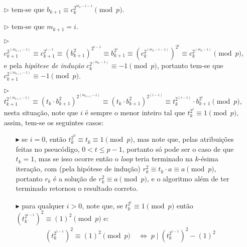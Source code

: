 \begin{enumerate}
\begin{itemize}
\begin{itemize}
                \vspace{4mm}
                \item[$\triangleright$] tem-se que $b_{k+1} \equiv c_{k}^{2^{m_k - i - 1}} \pmod{p}$.
                \vspace{4mm}
                \item[$\triangleright$] tem-se que $m_{k+1} = i$.
                \vspace{4mm}
                \item[$\triangleright$] $c_{k+1}^{2^{(m_{k + 1} - 1)}} \equiv c_{k+1}^{2^{i - 1}} \equiv (b_{k+1}^{2})^{2^{i - 1}} \equiv b_{k+1}^{2^i} \equiv (c_{k}^{2^{(m_k - i - 1)}})^{2^i} \equiv c_{k}^{2^{(m_k - 1)}} \pmod{p}$, e pela \textit{hipótese de indução}
                $c_{k}^{2^{(m_k - 1)}} \equiv -1  \pmod{p}$, portanto tem-se que $c_{k+1}^{2^{(m_{k + 1} - 1)}} \equiv -1  \pmod{p}$.
                \vspace{4mm}
                \item[$\triangleright$]
                $t_{k+1}^{2^{(m_{k+1} - 1)}} \equiv (t_k \cdot b_{k+1}^2)^{2^{(m_{k+1} - 1)}} \equiv (t_k \cdot b_{k+1}^2)^{2^{(i - 1)}} \equiv t_{k}^{2^{(i - 1)}} \cdot b_{k+1}^{2^i} \pmod{p}$, nesta situação, note que $i$ é sempre o menor inteiro tal que $t_{k}^{2^i} \equiv 1 \pmod{p}$, assim, tem-se os seguintes casos:
                \vspace{4mm}
                    \begin{itemize}
                        \item[$\blacktriangleright$] se $i = 0$, então $t_k^{2^0} \equiv t_k \equiv 1 \pmod{p}$, mas note que, pelas atribuições feitas no pseucódigo, $0 < t \leq p-1$, portanto só pode ser o caso de que $t_k = 1$, mas se isso ocorre então o \textit{loop} teria terminado na $k$-ésima iteração, com (pela hipótese de indução) $r_k^2 \equiv t_k \cdot a \equiv a \pmod{p}$, portanto $r_k$ é a solução de $r_k^2 \equiv a \pmod{p}$, e o algoritmo além de ter terminado retornou o resultado correto. 
                        \vspace{4mm}
                        \item[$\blacktriangleright$] para qualquer $i > 0$, note que, se $t_k^{2^i} \equiv 1 \pmod{p}$ então
                        $(t_k^{2^{i-1}})^2 \equiv (1)^2 \pmod{p}$ e:
                        \begin{align*}
                            (t_k^{2^{i-1}})^2 \equiv (1)^2 \pmod{p} & \; \Longleftrightarrow \; p \mid (t_k^{2^{i-1}})^2 - (1)^2
                            \\

\end{align*}
\end{itemize}
\end{itemize}
\end{itemize}
\end{enumerate}
